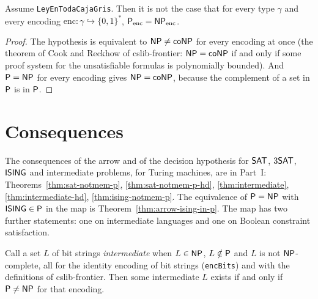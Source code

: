 \begin{theorem}
  \label{thm:arrow-gray-box-implies}
  \leanok
  Assume \texttt{LeyEnTodaCajaGris}. Then it is not the case that for every type $\gamma$ and every
  encoding $\mathrm{enc} : \gamma \hookrightarrow \{0,1\}^*$, $\mathsf{P}_{\mathrm{enc}} = \mathsf{NP}_{\mathrm{enc}}$.
  \own{}
\end{theorem}

\begin{proof}
  \leanok
  The hypothesis is equivalent to $\mathsf{NP} \neq \mathsf{co}\mathsf{NP}$ for every encoding at once (the
  theorem of Cook and Reckhow of cslib-frontier: $\mathsf{NP} = \mathsf{co}\mathsf{NP}$ if and only if some proof
  system for the unsatisfiable formulas is polynomially bounded). And $\mathsf{P} = \mathsf{NP}$ for every
  encoding gives $\mathsf{NP} = \mathsf{co}\mathsf{NP}$, because the complement of a set in $\mathsf{P}$ is in $\mathsf{P}$.
\end{proof}

\section{Consequences}
\label{sec:arrow-consequences}

The consequences of the arrow and of the decision hypothesis for $\mathsf{SAT}$, $3\mathsf{SAT}$, $\mathsf{ISING}$ and
intermediate problems, for Turing machines, are in Part~I: Theorems~\ref{thm:sat-notmem-p},
\ref{thm:sat-notmem-p-hd}, \ref{thm:intermediate}, \ref{thm:intermediate-hd},
\ref{thm:ising-notmem-p}. The equivalence of $\mathsf{P} = \mathsf{NP}$ with $\mathsf{ISING} \in \mathsf{P}$ in the map is
Theorem~\ref{thm:arrow-ising-in-p}. The map has two further statements: one on intermediate
languages and one on Boolean constraint satisfaction.

\begin{theorem}
  \label{thm:arrow-intermediate}
  \leanok
  Call a set $L$ of bit strings \emph{intermediate} when $L \in \mathsf{NP}$, $L \notin \mathsf{P}$ and $L$ is not
  $\mathsf{NP}$-complete, all for the identity encoding of bit strings (\texttt{encBits}) and with the
  definitions of cslib-frontier. Then some intermediate $L$ exists if and only if $\mathsf{P} \neq \mathsf{NP}$ for
  that encoding.
  \own{}
\end{theorem}

